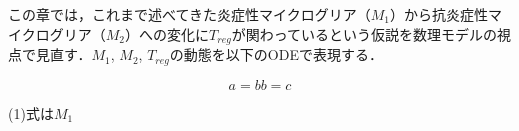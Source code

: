 \documentclass{jsarticle}
\begin{document}
この章では，これまで述べてきた炎症性マイクログリア（$M_1$）から抗炎症性マイクログリア（$M_2$）への変化に$T_{reg}$が関わっているという仮説を数理モデルの視点で見直す．$M_1$, $M_2$, $T_{reg}$の動態を以下のODEで表現する．

\begin{equation}
a=b
b=c
\end{equation}

(1)式は$M_1$
\end{document}
